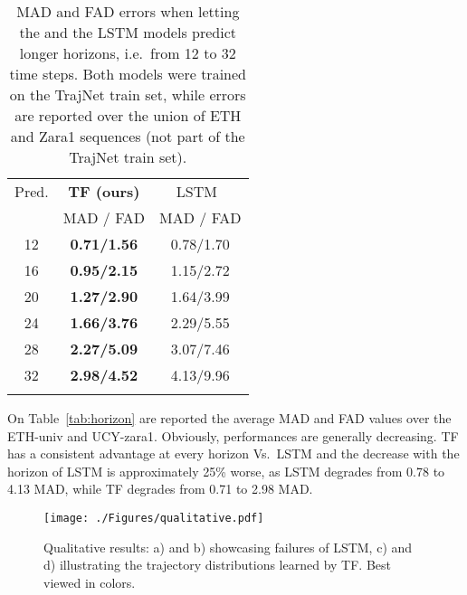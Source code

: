 \documentclass[a4paper,conference]{IEEEtran}
\begin{document}
\begin{table}[h] 
\begin{center}
\footnotesize
\caption{MAD and FAD errors when letting the  and the LSTM models predict longer horizons, i.e.\ from 12 to 32 time steps. Both models were trained on the TrajNet train set, while errors are reported over the union of ETH and Zara1 sequences (not part of the TrajNet train set).}
 \begin{tabular}{ccc}
  \toprule
    {Pred.} & {\textbf{TF (ours)}} & {LSTM~\cite{LSTM_MATLAB}}  \\ 
    {} & {MAD / FAD} & {MAD / FAD}\\\midrule
12      & \textbf{0.71/1.56} & 0.78/1.70 \\
16      & \textbf{0.95/2.15} & 1.15/2.72 \\
20      & \textbf{1.27/2.90} & 1.64/3.99 \\
24      & \textbf{1.66/3.76} & 2.29/5.55 \\
28      & \textbf{2.27/5.09} & 3.07/7.46 \\
32      & \textbf{2.98/4.52} & 4.13/9.96\\
\bottomrule \label{tab:horizon}
\end{tabular}
\end{center}
\label{Tab:var_length}\vspace{-0.5cm}

\end{table}
On Table~\ref{tab:horizon} are reported the average MAD and FAD values over the ETH-univ and UCY-zara1. Obviously, performances are generally decreasing. TF has a consistent advantage at every horizon Vs.\ LSTM and the decrease with the horizon of LSTM is approximately 25\% worse, as LSTM degrades from 0.78 to 4.13 MAD, while TF degrades from 0.71 to 2.98 MAD.
\begin{figure*}[!b]
\texttt{[image: ./Figures/qualitative.pdf]}
    \caption{Qualitative results: a) and b) showcasing failures of LSTM, c) and d) illustrating the trajectory distributions learned by TF. Best viewed in colors.}
\label{fig:trajnet-qualit}
\end{figure*}{}
\end{document}
